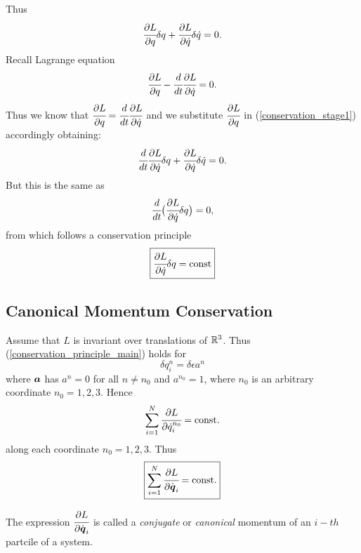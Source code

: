 \documentclass[main.tex]{subfiles}
\begin{document}
Thus
\begin{equation}
\label{conservation_stage1}
\cfrac{\partial L}{\partial q}\delta q + \cfrac{\partial L}{\partial \dot{q}}\delta \dot{q} = 0. 
\end{equation}
Recall Lagrange equation
\begin{equation}
\label{lagrange_equation3}
\cfrac{\partial L}{\partial q} - \cfrac{d}{dt}\cfrac{\partial L}{\partial \dot{q}} = 0.
\end{equation}
Thus we know that $\cfrac{\partial L}{\partial q} = \cfrac{d}{dt}\cfrac{\partial L}{\partial \dot{q}}$ and we substitute $\cfrac{\partial L}{\partial q}$ in (\ref{conservation_stage1}) accordingly obtaining:
\begin{equation}
\cfrac{d}{dt}\cfrac{\partial L}{\partial \dot{q}}\delta q + \cfrac{\partial L}{\partial \dot{q}}\delta \dot{q} = 0. 
\end{equation}
But this is the same as
\begin{equation}
\cfrac{d}{dt}\big( \cfrac{\partial L}{\partial \dot{q}}\delta q \big) = 0,
\end{equation}
from which follows a conservation principle
\begin{equation}
\label{conservation_principle_main}
\boxed{
 \cfrac{\partial L}{\partial \dot{q}}\delta q = \text{const}
 }
\end{equation}
\subsection{Canonical Momentum Conservation}
Assume that $L$ is invariant over translations of $\mathbb{R}^3$. Thus (\ref{conservation_principle_main}) holds for
\begin{equation}
\delta q^{n}_i = \delta\epsilon a^{n}
\end{equation}
where $\boldsymbol{a}$ has $a^n = 0$ for all $n\not=n_0$ and $a^{n_0} = 1$, where $n_0$ is an arbitrary coordinate $n_0 = 1, 2, 3$.
Hence
\begin{equation}
\sum_{i=1}^{N} \cfrac{\partial L}{\partial \dot{q}^{n_0}_i} = \text{const}.
\end{equation}
along each coordinate $n_0 = 1, 2, 3$. Thus
\begin{equation}
\boxed{
\sum_{i=1}^{N} \cfrac{\partial L}{\partial \dot{\boldsymbol{q}}_i} = \text{const}.
}
\end{equation}

The expression $\cfrac{\partial L}{\partial \dot{\boldsymbol{q}}_i}$ is called a \textit{conjugate} or \textit{canonical} momentum of an $i-th$ partcile of a system.
\end{document}
